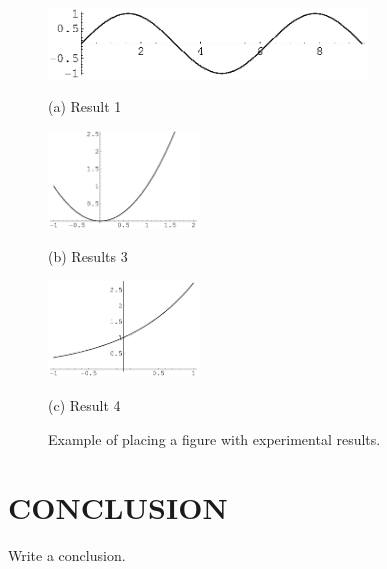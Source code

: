 \documentclass{article}
\begin{document}
\begin{figure}[htb]

\begin{minipage}[b]{1.0\linewidth}
  \centering
  \centerline{\includegraphics[width=8.5cm]{image1}}
  \centerline{(a) Result 1}\medskip
\end{minipage}
%
\begin{minipage}[b]{.48\linewidth}
  \centering
  \centerline{\includegraphics[width=4.0cm]{image3}}
  \centerline{(b) Results 3}\medskip
\end{minipage}
\hfill
\begin{minipage}[b]{0.48\linewidth}
  \centering
  \centerline{\includegraphics[width=4.0cm]{image4}}
  \centerline{(c) Result 4}\medskip
\end{minipage}
%
\caption{Example of placing a figure with experimental results.}
\label{fig:res}
%
\end{figure}



\section{CONCLUSION}
\label{sec:CONC}

Write a conclusion. 





\end{document}
